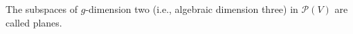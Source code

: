 The subspaces of $g$-dimension two (i.e., algebraic dimension three) in $\mathcal{P}(V)$ are called planes.
